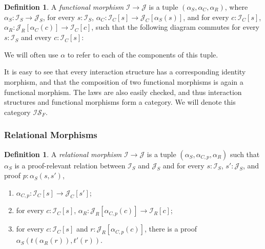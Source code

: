 \documentclass{article}
\theoremstyle{definition}
\newtheorem{definition}[theorem]{Definition}
\newcommand{\mc}[1]{\mathcal{#1}}
\newcommand{\iss}[1]{\mathcal{#1}_S}
\newcommand{\isc}[1]{\mathcal{#1}_C}
\newcommand{\isr}[1]{\mathcal{#1}_R}
\begin{document}
    \begin{definition}
        A \emph{functional morphism} $\mc I \to \mc J$ is a tuple $(\alpha_S, \alpha_C, \alpha_R)$, where $\alpha_S :
        \iss I \to \iss J$, for every $s : \iss I$, $\alpha_C : \isc I [s] \to \isc J [\alpha_S(s)]$, and for every $c :
        \isc I [s]$, $\alpha_R : \isr J [\alpha_C(c)] \to \isc I [c]$, such that the following diagram commutes for
        every $s : \iss I$ and every $c : \isc I [s]$:
        \begin{center}
        \end{center}
    \end{definition}

    We will often use $\alpha$ to refer to each of the components of this tuple.

    It is easy to see that every interaction structure has a corresponding identity morphism, and that the composition
    of two functional morphisms is again a functional morphism.  The laws are also easily checked, and thus interaction
    structures and functional morphisms form a category.  We will denote this category $\mathcal{IS}_F$.

    \subsubsection{Relational Morphisms}

    \begin{definition}
        A \emph{relational morphism} $\mc I \to \mc J$ is a tuple $(\alpha_S, \alpha_{C, p}, \alpha_R)$
        such that $\alpha_S$ is a proof-relevant relation between $\iss I$ and $\iss J$ and for every $s : \iss I$, $s'
        : \iss J$, and proof $p : \alpha_S(s, s')$,
        \begin{enumerate}
            \item $\alpha_{C, p} : \isc I [s] \to \isc J [s']$;
            \item for every $c : \isc I [s]$, $\alpha_R : \isr J [\alpha_{C, p}(c)] \to \isr I [c]$;
            \item for every $c : \isc I [s]$ and $r : \isr J [\alpha_{C, p}(c)]$, there is a proof $\alpha_S(t(\alpha_R(r)),
                t'(r))$.
        \end{enumerate}
    \end{definition}
\end{document}
